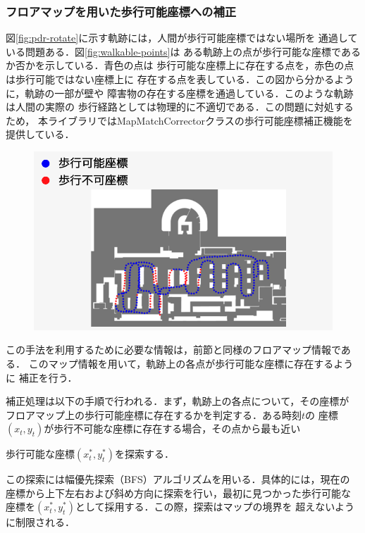 
\subsubsection{フロアマップを用いた歩行可能座標への補正}

図\ref{fig:pdr-rotate}に示す軌跡には，人間が歩行可能座標ではない場所を
通過している問題ある．図\ref{fig:walkable-points}は
ある軌跡上の点が歩行可能な座標であるか否かを示している．青色の点は
歩行可能な座標上に存在する点を，赤色の点は歩行可能ではない座標上に
存在する点を表している．この図から分かるように，軌跡の一部が壁や
障害物の存在する座標を通過している．このような軌跡は人間の実際の
歩行経路としては物理的に不適切である．この問題に対処するため，
本ライブラリではMapMatchCorrectorクラスの歩行可能座標補正機能を提供している．

\begin{figure}[H]
    \centering
    \includegraphics[width=\linewidth]{image/unwalkable_points.jpg}
    \caption{}    \label{fig:unwalkable_points}
\end{figure}

この手法を利用するために必要な情報は，前節と同様のフロアマップ情報である．
このマップ情報を用いて，軌跡上の各点が歩行可能な座標に存在するように
補正を行う．

補正処理は以下の手順で行われる．まず，軌跡上の各点について，その座標が
フロアマップ上の歩行可能座標に存在するかを判定する．ある時刻$t$の
座標$(x_t, y_t)$が歩行不可能な座標に存在する場合，その点から最も近い

歩行可能な座標$(x_t^*, y_t^*)$を探索する．

この探索には幅優先探索（BFS）アルゴリズムを用いる．具体的には，現在の
座標から上下左右および斜め方向に探索を行い，最初に見つかった歩行可能な
座標を$(x_t^*, y_t^*)$として採用する．この際，探索はマップの境界を
超えないように制限される．

